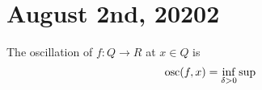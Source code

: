 \section{August 2nd, 20202}

\begin{definition}[oscillation]
  The oscillation of $f : Q \to R$ at $x \in Q$ is 
  \[\operatorname*{osc}(f,x) = \inf_{\delta > 0} \sup \]
\end{definition}

